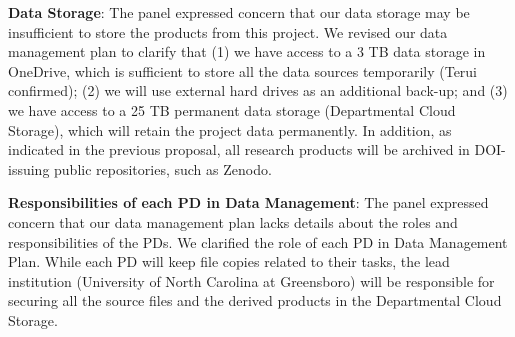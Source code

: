 \documentclass[12pt, class=article, crop=false]{standalone}
\begin{document}
\textbf{Data Storage}:
The panel expressed concern that our data storage may be insufficient to store the products from this project.
We revised our data management plan to clarify that (1) we have access to a 3 TB data storage in OneDrive, which is sufficient to store all the data sources temporarily (Terui confirmed); (2) we will use external hard drives as an additional back-up; and (3) we have access to a 25 TB permanent data storage (Departmental Cloud Storage), which will retain the project data permanently.
In addition, as indicated in the previous proposal, all research products will be archived in DOI-issuing public repositories, such as Zenodo. 

\textbf{Responsibilities of each PD in Data Management}:
The panel expressed concern that our data management plan lacks details about the roles and responsibilities of the PDs.
We clarified the role of each PD in Data Management Plan.
While each PD will keep file copies related to their tasks, the lead institution (University of North Carolina at Greensboro) will be responsible for securing all the source files and the derived products in the Departmental Cloud Storage.
\end{document}
